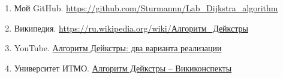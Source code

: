 \begin{text}
\begin{enumerate}
	\item Мой GitHub. \url{https://github.com/Sturmannn/Lab_Dijkstra_algorithm}
	\item Википедия. \href{https://ru.wikipedia.org/wiki/%D0%90%D0%BB%D0%B3%D0%BE%D1%80%D0%B8%D1%82%D0%BC_%D0%94%D0%B5%D0%B9%D0%BA%D1%81%D1%82%D1%80%D1%8B}{https://ru.wikipedia.org/wiki/Алгоритм\_Дейкстры}
	\item YouTube. \href{https://www.youtube.com/watch?v=J-7MzbEtTR0&t=2s}{Алгоритм Дейкстры: два варианта реализации}
	\item Университет ИТМО. \href{https://neerc.ifmo.ru/wiki/index.php?title=%D0%90%D0%BB%D0%B3%D0%BE%D1%80%D0%B8%D1%82%D0%BC_%D0%94%D0%B5%D0%B9%D0%BA%D1%81%D1%82%D1%80%D1%8B}{Алгоритм Дейкстры -- Викиконспекты}
\end{enumerate}

\end{text}
